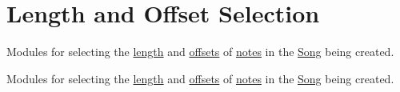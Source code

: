 \hypertarget{group___doc_s_c___l_o_s}{}\section{Length and Offset Selection}
\label{group___doc_s_c___l_o_s}


Modules for selecting the \hyperlink{group___music_enums_gaf11b5f079adbb21c800b9eca1c5c3cbd}{length} and \hyperlink{group___music_structs_ae281187907aed4c728c7981300dbebaf}{offsets} of \hyperlink{group___music_structs_struct_music_1_1_combined_note}{notes} in the \hyperlink{class_song}{Song} being created.  


Modules for selecting the \hyperlink{group___music_enums_gaf11b5f079adbb21c800b9eca1c5c3cbd}{length} and \hyperlink{group___music_structs_ae281187907aed4c728c7981300dbebaf}{offsets} of \hyperlink{group___music_structs_struct_music_1_1_combined_note}{notes} in the \hyperlink{class_song}{Song} being created. 


